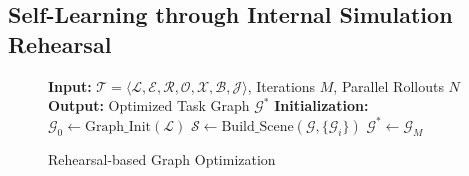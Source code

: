\subsection{Self-Learning through Internal Simulation Rehearsal}
\label{sec:optimization}
\renewcommand{\algorithmcfname}{Self-Learning-Algorithm} %
\begin{figure}
\vspace{-24pt}
\begin{minipage}{0.55\textwidth}
\begin{algorithm}[H]
\scriptsize 
\DontPrintSemicolon
\caption{Rehearsal-based Graph Optimization}
\label{alg:graph_opt}
\noindent\textbf{Input:} $\mathcal{T} = \langle \mathcal{L}, \mathcal{E}, \mathcal{R}, \mathcal{O}, \mathcal{X}, \mathcal{B}, \mathcal{J} \rangle$,  Iterations $M$, Parallel Rollouts $N$
\noindent\textbf{Output:} Optimized Task Graph $\mathcal{G}^*$
\BlankLine
\textbf{Initialization:}\;
$\mathcal{G}_0 \leftarrow \mathrm{Graph\_Init}(\mathcal{L})$\;
\quad{}
$\mathcal{S} \leftarrow \mathrm{Build\_Scene}(\mathcal{G}, \{\mathcal{G}_i\})$\;
\quad{}
\Return $\mathcal{G}^* \leftarrow \mathcal{G}_M$\;
\end{algorithm}
\end{minipage}
\vspace{-8pt}
\end{figure}
